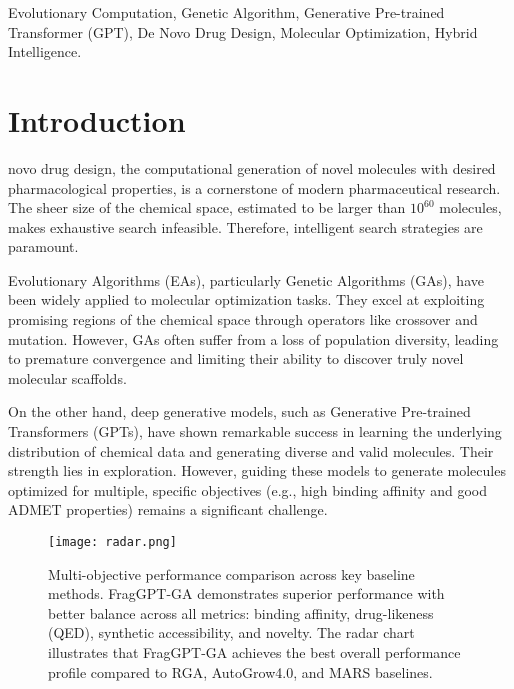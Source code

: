 \documentclass[lettersize,journal]{IEEEtran}
\begin{document}
\begin{IEEEkeywords}
Evolutionary Computation, Genetic Algorithm, Generative Pre-trained Transformer (GPT), De Novo Drug Design, Molecular Optimization, Hybrid Intelligence.
\end{IEEEkeywords}

\section{Introduction}
 novo drug design, the computational generation of novel molecules with desired pharmacological properties, is a cornerstone of modern pharmaceutical research. The sheer size of the chemical space, estimated to be larger than $10^{60}$ molecules, makes exhaustive search infeasible. Therefore, intelligent search strategies are paramount.

Evolutionary Algorithms (EAs), particularly Genetic Algorithms (GAs), have been widely applied to molecular optimization tasks. They excel at exploiting promising regions of the chemical space through operators like crossover and mutation. However, GAs often suffer from a loss of population diversity, leading to premature convergence and limiting their ability to discover truly novel molecular scaffolds.

On the other hand, deep generative models, such as Generative Pre-trained Transformers (GPTs), have shown remarkable success in learning the underlying distribution of chemical data and generating diverse and valid molecules. Their strength lies in exploration. However, guiding these models to generate molecules optimized for multiple, specific objectives (e.g., high binding affinity and good ADMET properties) remains a significant challenge.

\begin{figure}[!t]
\centering
\texttt{[image: radar.png]}
\caption{Multi-objective performance comparison across key baseline methods. FragGPT-GA demonstrates superior performance with better balance across all metrics: binding affinity, drug-likeness (QED), synthetic accessibility, and novelty. The radar chart illustrates that FragGPT-GA achieves the best overall performance profile compared to RGA, AutoGrow4.0, and MARS baselines.}
\label{fig:radar_comparison}
\end{figure}
\end{document}
